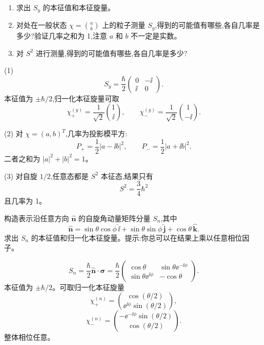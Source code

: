 \begin{question}
\begin{enumerate}
\item 求出 $S_y$ 的本征值和本征旋量。
\item 对处在一般状态 $\chi=\binom{a}{b}$ 上的粒子测量 $S_y$,得到的可能值有哪些,各自几率是多少?验证几率之和为 1,注意 $a$ 和 $b$ 不一定是实数。
\item 对 $S^2$ 进行测量,得到的可能值有哪些,各自几率是多少?
\end{enumerate}
\begin{solution}

(1) 
\[
S_y=\frac\hbar2\begin{pmatrix}0&-\ii\\ \ii&0\end{pmatrix}.
\]
本征值为 $\pm\hbar/2$,归一化本征旋量可取
\[
\chi_+^{(y)}=\frac1{\sqrt2}\binom{1}{\ii},
\qquad
\chi_-^{(y)}=\frac1{\sqrt2}\binom{1}{-\ii}.
\]

(2) 对 $\chi=(a,b)^T$,几率为投影模平方:
\[
P_+=\frac12|a-\ii b|^2,
\qquad
P_-=\frac12|a+\ii b|^2.
\]
二者之和为 $|a|^2+|b|^2=1$。

(3) 对自旋 $1/2$,任意态都是 $S^2$ 本征态,结果只有
\[
S^2=\frac34\hbar^2
\]
且几率为 1。

\end{solution}
\end{question}

\begin{question}
构造表示沿任意方向 $\hat{\mathbf n}$ 的自旋角动量矩阵分量 $S_n$,其中
\[
\hat{\mathbf n}=\sin\theta\cos\phi\,\hat{\mathbf \ii}+\sin\theta\sin\phi\,\hat{\mathbf j}+\cos\theta\,\hat{\mathbf k}.
\]
求出 $S_n$ 的本征值和归一化本征旋量。提示:你总可以在结果上乘以任意相位因子。
\begin{solution}

\[
S_n=\frac\hbar2\hat{\mathbf n}\cdot\boldsymbol\sigma
=\frac\hbar2\begin{pmatrix}
\cos\theta&\sin\theta \ee^{-\ii\phi}\\
\sin\theta \ee^{\ii\phi}&-\cos\theta
\end{pmatrix}.
\]
本征值为 $\pm\hbar/2$。可取归一化本征旋量
\[
\chi_+^{(n)}=\binom{\cos(\theta/2)}{\ee^{\ii\phi}\sin(\theta/2)},
\]
\[
\chi_-^{(n)}=\binom{-\ee^{-\ii\phi}\sin(\theta/2)}{\cos(\theta/2)}.
\]
整体相位任意。

\end{solution}
\end{question}

